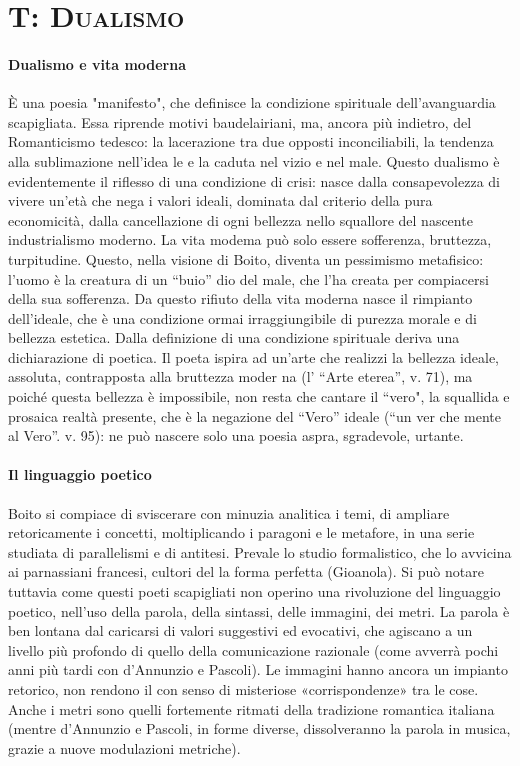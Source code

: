 \documentclass{book}
\begin{document}
\section{T: \textsc{Dualismo}}

\paragraph{Dualismo e vita moderna} È una poesia "manifesto", che definisce la condizione spirituale dell'avanguardia scapigliata. Essa riprende motivi baudelairiani, ma, ancora più indietro, del Romanticismo tedesco: la lacerazione tra due opposti inconciliabili, la tendenza alla sublimazione nell'idea le e la caduta nel vizio e nel male.
Questo dualismo è evidentemente il riflesso di una condizione di crisi: nasce dalla consapevolezza di vivere un'età che nega i valori ideali, dominata dal criterio della pura economicità, dalla cancellazione di ogni bellezza nello squallore del nascente industrialismo moderno. La vita modema può solo essere sofferenza, bruttezza, turpitudine. Questo, nella visione di Boito, diventa un pessimismo metafisico: l'uomo è la creatura di un ``buio'' dio del male, che l'ha creata per compiacersi della sua sofferenza. Da questo rifiuto della vita moderna nasce il rimpianto dell'ideale, che è una condizione ormai irraggiungibile di purezza morale e di bellezza estetica. Dalla definizione di una condizione spirituale deriva una dichiarazione di poetica. Il poeta ispira ad un'arte che realizzi la bellezza ideale, assoluta, contrapposta alla bruttezza moder na (l' ``Arte eterea'', v. 71), ma poiché questa bellezza è impossibile, non resta che cantare il ``vero", la squallida e prosaica realtà presente, che è la negazione del ``Vero'' ideale (``un ver che mente al Vero''. v. 95): ne può nascere solo una poesia aspra, sgradevole, urtante.

\paragraph{Il linguaggio poetico} Boito si compiace di sviscerare con minuzia analitica i temi, di ampliare retoricamente i concetti, moltiplicando i paragoni e le metafore, in una serie studiata di parallelismi e di antitesi. Prevale lo studio formalistico, che lo avvicina ai parnassiani francesi, cultori del la forma perfetta (Gioanola). Si può notare tuttavia come questi poeti scapigliati non operino una rivoluzione del linguaggio poetico, nell'uso della parola, della sintassi, delle immagini, dei metri. La parola è ben lontana dal caricarsi di valori suggestivi ed evocativi, che agiscano a un livello più profondo di quello della comunicazione razionale (come avverrà pochi anni più tardi con d'Annunzio e Pascoli). Le immagini hanno ancora un impianto retorico, non rendono il con senso di misteriose «corrispondenze» tra le cose. Anche i metri sono quelli fortemente ritmati della tradizione romantica italiana (mentre d'Annunzio e Pascoli, in forme diverse, dissolveranno la parola in musica, grazie a nuove modulazioni metriche).
\end{document}
